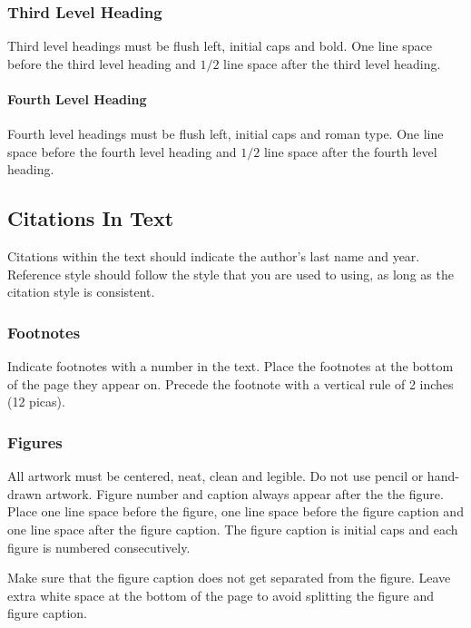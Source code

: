 \documentclass[a4paper]{article}
\begin{document}
\subsubsection{Third Level Heading}

Third level headings must be flush left, initial caps and bold.
One line space before the third level heading and $1/2$ line
space after the third level heading.

\paragraph{Fourth Level Heading}

Fourth level headings must be flush left, initial caps and roman type.
One line space before the fourth level heading and $1/2$ line
space after the fourth level heading.

\subsection{Citations In Text}

Citations within the text should indicate the author's last name and
year\cite{Knuth-vol3}. Reference style\cite{Comer-btree}
should follow the style that you are used to using, as long as the
citation style is consistent.

\subsubsection{Footnotes}

Indicate footnotes with a number in
the text. Place the footnotes at the bottom of the page they appear on.
Precede the footnote with a vertical rule of 2 inches (12 picas).

\subsubsection{Figures}

All artwork must be centered, neat, clean and legible. Do not use pencil
or hand-drawn artwork. Figure number and caption always appear after the
the figure. Place one line space before the figure, one line space
before the figure caption and one line space after the figure caption.
The figure caption is initial caps and each figure is numbered
consecutively.

Make sure that the figure caption does not get separated from the
figure. Leave extra white space at the bottom of the page to avoid
splitting the figure and figure caption.
\end{document}
